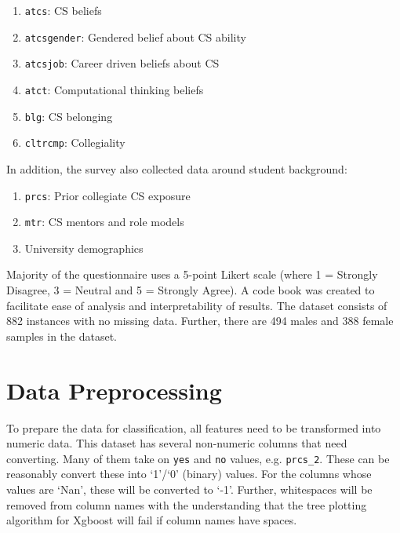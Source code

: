 \begin{enumerate}%
\item \texttt{atcs}: CS beliefs
\item \texttt{atcsgender}: Gendered belief about CS ability
\item \texttt{atcsjob}: Career driven beliefs about CS
\item \texttt{atct}: Computational thinking beliefs
\item \texttt{blg}: CS belonging
\item \texttt{cltrcmp}: Collegiality
\end{enumerate}

In addition, the survey also collected data around student background: 

\begin{enumerate}%
\item \texttt{prcs}: Prior collegiate CS exposure
\item \texttt{mtr}: CS mentors and role models
\item University demographics
\end{enumerate}



Majority of the questionnaire uses a 5-point Likert scale (where 1 = Strongly Disagree, 3 = Neutral and 5 = Strongly Agree). A code book was created to facilitate ease of analysis and interpretability of results. The dataset consists of 882 instances with no missing data. Further, there are 494 males and 388 female samples in the dataset. 




\section*{Data Preprocessing}

To prepare the data for classification, all features need to be transformed into numeric data. This dataset has several non-numeric columns that need converting. Many of them take on \texttt{yes} and \texttt{no} values, e.g. \texttt{prcs\_2}. These can be reasonably convert these into `1'/`0' (binary) values. For the columns whose values are `Nan', these will be converted to `-1'. Further, whitespaces will be removed from column names with the understanding that the tree plotting algorithm for Xgboost will fail if column names have spaces. 

